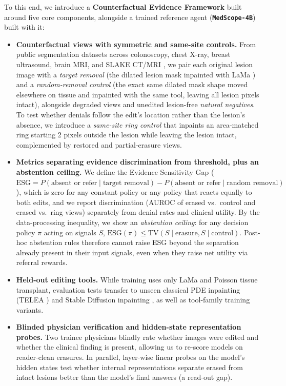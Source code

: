\documentclass[5p,times,twocolumn,authoryear]{elsarticle}
\begin{document}
To this end, we introduce a \textbf{Counterfactual Evidence Framework} built around five core components, alongside a trained reference agent (\textbf{\texttt{MedScope-4B}}) built with it:
\begin{itemize}[leftmargin=*,nosep]
    \item \textbf{Counterfactual views with symmetric and same-site controls.} From public segmentation datasets across colonoscopy, chest X-ray, breast ultrasound, brain MRI, and SLAKE CT/MRI \citep{liu2021slake,jha2020kvasir,borgli2020hyperkvasir,liu2020chestxdet,al2020dataset,buda2019association}, we pair each original lesion image with a \emph{target removal} (the dilated lesion mask inpainted with LaMa \citep{suvorov2022lama}) and a \emph{random-removal control} (the exact same dilated mask shape moved elsewhere on tissue and inpainted with the same tool, leaving all lesion pixels intact), alongside degraded views and unedited lesion-free \emph{natural negatives}. To test whether denials follow the edit's location rather than the lesion's absence, we introduce a \emph{same-site ring control} that inpaints an area-matched ring starting 2 pixels outside the lesion while leaving the lesion intact, complemented by restored and partial-erasure views.
    \item \textbf{Metrics separating evidence discrimination from threshold, plus an abstention ceiling.} We define the Evidence Sensitivity Gap ($\text{ESG} = P(\text{absent or refer} \mid \text{target removal}) - P(\text{absent or refer} \mid \text{random removal})$), which is zero for any constant policy or any policy that reacts equally to both edits, and we report discrimination (AUROC of erased vs.\ control and erased vs.\ ring views) separately from denial rates and clinical utility. By the data-processing inequality, we show an \emph{abstention ceiling}: for any decision policy $\pi$ acting on signals $S$, $\text{ESG}(\pi) \le \text{TV}(S \mid \text{erasure}, S \mid \text{control})$. Post-hoc abstention rules therefore cannot raise ESG beyond the separation already present in their input signals, even when they raise net utility via referral rewards.
    \item \textbf{Held-out editing tools.} While training uses only LaMa and Poisson tissue transplant, evaluation tests transfer to unseen classical PDE inpainting (TELEA \citep{telea2004image}) and Stable Diffusion inpainting \citep{rombach2022high}, as well as tool-family training variants.
    \item \textbf{Blinded physician verification and hidden-state representation probes.} Two trainee physicians blindly rate whether images were edited and whether the clinical finding is present, allowing us to re-score models on reader-clean erasures. In parallel, layer-wise linear probes \citep{alain2016understanding} on the model's hidden states test whether internal representations separate erased from intact lesions better than the model's final answers (a read-out gap).

\end{itemize}
\end{document}
